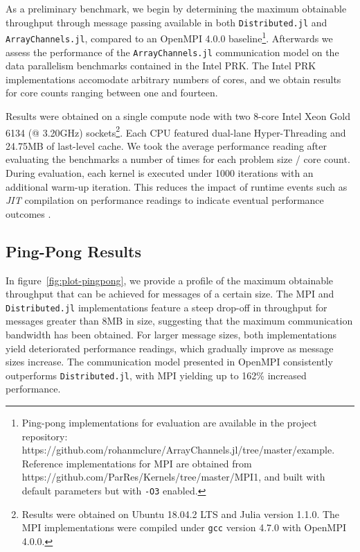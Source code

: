 \label{sec:results}

As a preliminary benchmark, we begin by determining the maximum
obtainable throughput through message passing available in both
\texttt{Distributed.jl} and \texttt{ArrayChannels.jl}, compared to an
OpenMPI 4.0.0 baseline\footnote{Ping-pong implementations for evaluation
  are available in the project repository:
  https://github.com/rohanmclure/ArrayChannels.jl/tree/master/example.
  Reference implementations for MPI are obtained from
  https://github.com/ParRes/Kernels/tree/master/MPI1, and built with
  default parameters but with \texttt{-O3} enabled.}. Afterwards we
assess the performance of the \texttt{ArrayChannels.jl} communication
model on the data parallelism benchmarks contained in the Intel PRK. The
Intel PRK implementations accomodate arbitrary numbers of cores, and we
obtain results for core counts ranging between one and fourteen.

Results were obtained on a single compute node with two 8-core Intel
Xeon Gold 6134 (@ 3.20GHz) sockets\footnote{Results were obtained on
  Ubuntu 18.04.2 LTS and Julia version 1.1.0. The MPI implementations
  were compiled under \texttt{gcc} version 4.7.0 with OpenMPI 4.0.0.}.
Each CPU featured dual-lane Hyper-Threading and 24.75MB of last-level
cache. We took the average performance reading after evaluating the
benchmarks a number of times for each problem size / core count. During
evaluation, each kernel is executed under 1000 iterations with an
additional warm-up iteration. This reduces the impact of runtime events
such as \emph{JIT} compilation on performance readings to indicate
eventual performance outcomes \cite{blackburn, kulkarni}.

\subsection{Ping-Pong Results}
\label{sec:pingpong-results}

In figure~\ref{fig:plot-pingpong}, we provide a profile of the
maximum obtainable throughput that can be achieved for messages of a
certain size. The MPI and \texttt{Distributed.jl} implementations
feature a steep drop-off in throughput for messages greater than 8MB in
size, suggesting that the maximum communication bandwidth has been
obtained. For larger message sizes, both implementations yield
deteriorated performance readings, which gradually improve as message
sizes increase. The communication model presented in OpenMPI
consistently outperforms \texttt{Distributed.jl}, with MPI yielding up
to 162\% increased performance.


